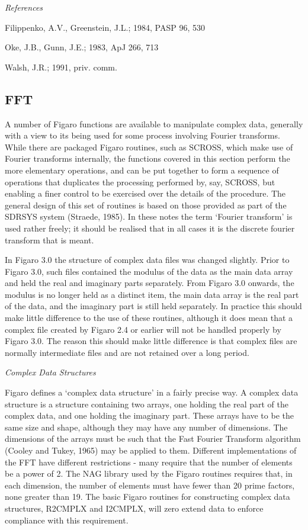 \goodbreak
\vspace{12pt}
{\it References}

Filippenko, A.V., Greenstein, J.L.; 1984, PASP 96, 530

Oke, J.B., Gunn, J.E.; 1983, ApJ 266, 713

Walsh, J.R.; 1991, priv. comm.


\subsection{FFT}

A number of Figaro functions are available to manipulate complex
data, generally with a view to its being used for some process involving
Fourier transforms.  While there are packaged Figaro routines, such as SCROSS,
which make use of Fourier transforms internally, the functions covered in 
this section perform the more elementary operations, and can be put 
together to form a sequence of operations that duplicates the processing
performed by, say, SCROSS, but enabling a finer control to be exercised
over the details of the procedure.  The general design of this set of
routines is based on those provided as part of the SDRSYS system (Straede,
1985).  In these notes the term `Fourier transform' is used rather freely;
it should be realised that in all cases it is the discrete fourier transform
that is meant.

In Figaro 3.0 the structure of complex data files was changed slightly.
Prior to Figaro 3.0, such files contained the modulus of the data as the
main data array and held the real and imaginary parts separately.  From
Figaro 3.0 onwards, the modulus is no longer held as a distinct item, the 
main data array is the real part of the data, and the imaginary part is
still held separately. In practice this should make little difference to
the use of these routines, although it does mean that a complex file created
by Figaro 2.4 or earlier will not be handled properly by Figaro 3.0. The
reason this should make little difference is that complex files are normally
intermediate files and are not retained over a long period.


\goodbreak
\vspace{12pt}
{\it Complex Data Structures}

Figaro defines a `complex data structure' in a fairly precise way.
A complex data structure is a structure containing two arrays, one
holding the real part of the complex data, and one holding the imaginary
part. These arrays have to be the same size and shape, although they may 
have any number of
dimensions.  The dimensions of the arrays must be such that the Fast
Fourier Transform algorithm (Cooley and Tukey, 1965) may be applied to 
them. Different implementations of the FFT have different 
restrictions - many require that the number of elements be a power of 2.  
The NAG library used by the Figaro routines requires that, in each dimension,
the number of elements must have fewer than 20 prime factors, none
greater than 19.  The basic Figaro routines for constructing complex
data structures, R2CMPLX and I2CMPLX, will zero extend data to enforce
compliance with this requirement.

